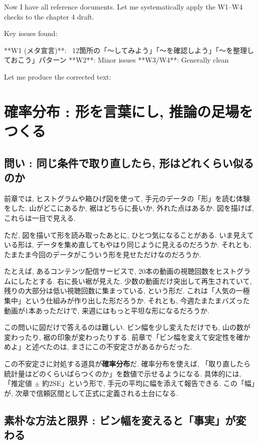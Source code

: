 ﻿Now I have all reference documents. Let me systematically apply the W1–W4 checks to the chapter 4 draft.

Key issues found:

**W1 (メタ宣言)**: ~12箇所の「〜してみよう」「〜を確認しよう」「〜を整理しておこう」パターン
**W2**: Minor issues
**W3/W4**: Generally clean

Let me produce the corrected text:

\section{確率分布 : 形を言葉にし, 推論の足場をつくる}

  \subsection{問い : 同じ条件で取り直したら, 形はどれくらい似るのか}

    前章では, ヒストグラムや箱ひげ図を使って, 手元のデータの「形」を読む体験をした.
    山がどこにあるか, 裾はどちらに長いか, 外れた点はあるか.
    図を描けば, これらは一目で見える.

    ただ, 図を描いて形を読み取ったあとに, ひとつ気になることがある.
    いま見えている形は, データを集め直してもやはり同じように見えるのだろうか.
    それとも, たまたま今回のデータがこういう形を見せただけなのだろうか.

    たとえば, あるコンテンツ配信サービスで, 20本の動画の視聴回数をヒストグラムにしたとする.
    右に長い裾が見えた.
    少数の動画だけ突出して再生されていて, 残りの大部分は低い視聴回数に集まっている, という形だ.
    これは「人気の一極集中」という仕組みが作り出した形だろうか.
    それとも, 今週たまたまバズった動画が1本あっただけで, 来週にはもっと平坦な形になるだろうか.

    この問いに図だけで答えるのは難しい.
    ビン幅を少し変えただけでも, 山の数が変わったり, 裾の印象が変わったりする.
    前章で「ビン幅を変えて安定性を確かめよ」と述べたのは, まさにこの不安定さがあるからだった.

    この不安定さに対処する道具が\textbf{確率分布}だ.
    確率分布を使えば, 「取り直したら統計量はどのくらいばらつくのか」を数値で示せるようになる.
    具体的には, 「推定値 $\pm$ 約$2$SE」という形で, 手元の平均に幅を添えて報告できる.
    この「幅」が, 次章で信頼区間として正式に定義される土台になる.

  \subsection{素朴な方法と限界 : ビン幅を変えると「事実」が変わる}

